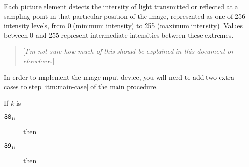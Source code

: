 \documentclass[a4paper,12pt]{article}
\newcommand{\num}[1]{\texttt{#1}}
\newcommand{\hex}[1]{\num{#1}_{\textup{\tiny 16}}}
\newcommand{\proc}[1]{\textsc{#1}}
\newcommand{\comment}[1]{\begin{quote}[\textit{#1}]\end{quote}}
\newcommand{\deviceio}[1]{$\langle$#1$\rangle$}
\newcommand{\op}[1]{$#1$}
\newcommand{\READFRAME} [1]{\op{\hex{38}}}
\newcommand{\READPIXEL} [1]{\op{\hex{39}}}
\begin{document}
Each picture element detects the intensity of light transmitted or reflected at a sampling point in that particular position of the image, represented as one of 256 intensity levels, from 0 (minimum intensity) to 255 (maximum intensity).
Values between 0 and 255 represent intermediate intensities between these extremes.

\comment{I'm not sure how much of this should be explained in this document or elsewhere.}

In order to implement the image input device, you will need to add two extra cases to step \ref{itm:main-case} of the main procedure.

\begin{stepnumbers}[start=3]
\item If $k$ is
  \begin{description}
  \item[\READFRAME{}] then
  \item[\READPIXEL{}] then
  \end{description}
\end{stepnumbers}
\end{document}
